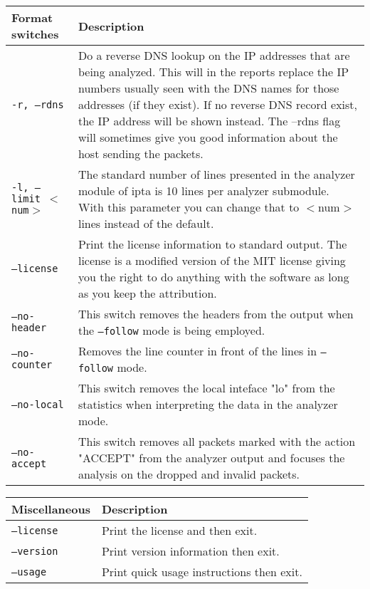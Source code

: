 \documentclass[english,twoside,openright,a4paper,12pt]{article}
\begin{document}
\scriptsize
\begin{longtable}{|p{}|p{}|}
\hline
\textbf{Format switches} & \textbf{Description}\\ \hline

\texttt{-r, --rdns} & 

Do a reverse DNS lookup on the IP addresses that are being analyzed.
This will in the reports replace the IP numbers usually seen with the
DNS names for those addresses (if they exist). If no reverse DNS
record exist, the IP address will be shown instead. The --rdns flag
will sometimes give you good information about the host sending the
packets.\\\hline

\texttt{-l, --limit $<$num$>$} & 

The standard number of lines presented in the analyzer module of ipta
is 10 lines per analyzer submodule. With this parameter you can change
that to $<$num$>$ lines instead of the default.\\\hline

\texttt{--license} & 

Print the license information to standard output. The license is a
modified version of the MIT license giving you the right to do
anything with the software as long as you keep the
attribution.\\ \hline

\texttt{--no-header} & 

This switch removes the headers from the output when the
\texttt{--follow} mode is being employed.\\\hline

\texttt{--no-counter} & 

Removes the line counter in front of the lines in \texttt{--follow}
mode.\\\hline

\texttt{--no-local} & 

This switch removes the local inteface "lo" from the statistics when
interpreting the data in the analyzer mode.\\\hline

\texttt{--no-accept} & 

This switch removes all packets marked with the action "ACCEPT" from
the analyzer output and focuses the analysis on the dropped and
invalid packets.\\\hline
\end{longtable}

\scriptsize
\begin{longtable}{|p{}|p{}|}
\hline
\textbf{Miscellaneous} & \textbf{Description}\\ \hline

\texttt{--license} &
Print the license and then exit.\\\hline

\texttt{--version} &
Print version information then exit.\\\hline

\texttt{--usage} &
Print quick usage instructions then exit.\\\hline

\end{longtable}
\normalsize
\end{document}
